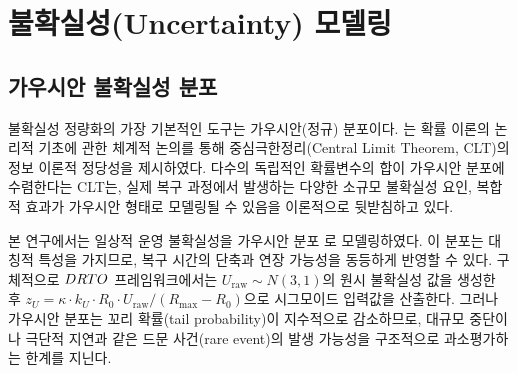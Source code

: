 

\section{불확실성(Uncertainty) 모델링}
\label{sec:lit-uncertainty}


\subsection{가우시안 불확실성 분포}
\label{subsec:gaussian-uncertainty}

불확실성 정량화의 가장 기본적인 도구는 가우시안(정규) 분포이다.
\citet{jaynes2003probability}는 확률 이론의 논리적 기초에 관한 체계적 논의를 통해
중심극한정리(Central Limit Theorem, CLT)의 정보 이론적 정당성을 제시하였다.
다수의 독립적인 확률변수의 합이 가우시안 분포에 수렴한다는 CLT는,
실제 복구 과정에서 발생하는 다양한 소규모 불확실성 요인,  복합적 효과가
가우시안 형태로 모델링될 수 있음을 이론적으로 뒷받침하고 있다.

본 연구에서는 일상적 운영 불확실성을 가우시안 분포 로
모델링하였다. 이 분포는 대칭적 특성을 가지므로, 복구 시간의 단축과 연장 가능성을
동등하게 반영할 수 있다. 구체적으로 $DRTO$ 프레임워크에서는
$U_{\text{raw}} \sim N(3, 1)$의 원시 불확실성 값을 생성한 후
$z_U = \kappa \cdot k_U \cdot R_0 \cdot U_{\text{raw}} / (R_{\max} - R_0)$으로
시그모이드 입력값을 산출한다.
그러나 가우시안 분포는 꼬리 확률(tail probability)이 지수적으로 감소하므로,
대규모 중단이나 극단적 지연과 같은 드문 사건(rare event)의 발생 가능성을
구조적으로 과소평가하는 한계를 지닌다.


